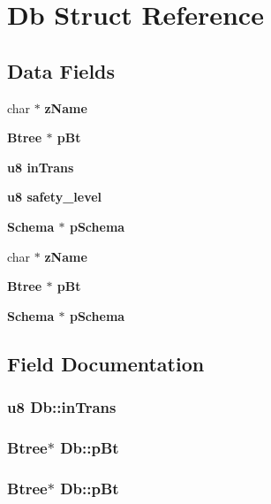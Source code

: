 \section{Db Struct Reference}
\label{structDb}
\subsection*{Data Fields}
\begin{CompactItemize}
\item 
char $\ast$ \bf{z\-Name}
\item 
\bf{Btree} $\ast$ \bf{p\-Bt}
\item 
\bf{u8} \bf{in\-Trans}
\item 
\bf{u8} \bf{safety\_\-level}
\item 
\bf{Schema} $\ast$ \bf{p\-Schema}
\item 
char $\ast$ \bf{z\-Name}
\item 
\bf{Btree} $\ast$ \bf{p\-Bt}
\item 
\bf{Schema} $\ast$ \bf{p\-Schema}
\end{CompactItemize}


\subsection{Field Documentation}
\subsubsection{\setlength{\rightskip}{0pt plus 5cm}\bf{u8} \bf{Db::in\-Trans}}\label{structDb_4db93483a1e627a8a648359a893d0112}


\subsubsection{\setlength{\rightskip}{0pt plus 5cm}\bf{Btree}$\ast$ \bf{Db::p\-Bt}}\label{structDb_a38dda806133805b069b053729b38dd6}


\subsubsection{\setlength{\rightskip}{0pt plus 5cm}\bf{Btree}$\ast$ \bf{Db::p\-Bt}}\label{structDb_a38dda806133805b069b053729b38dd6}


